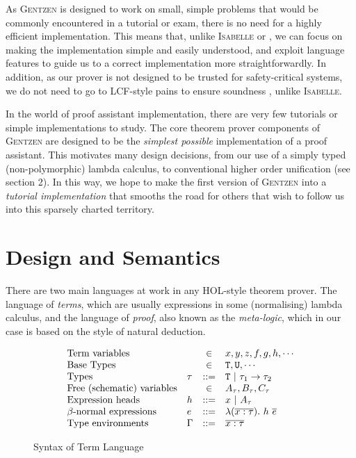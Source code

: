 \documentclass[a4paper]{jfp}
\begin{document}
As \textsc{Gentzen} is designed to work on small, simple problems that would be
commonly encountered in a tutorial or exam, there is no need for a highly
efficient implementation.  This means that, unlike \textsc{Isabelle} or
, we can focus on making the implementation simple and easily
understood, and exploit language features to guide us to a correct
implementation more straightforwardly. In addition, as our prover is not
designed to be trusted for safety-critical systems, we do not need to go to
LCF-style pains to ensure soundness \cite{Milner:1972:LCF:891954}, unlike \textsc{Isabelle}.

In the world of proof assistant implementation, there are very few tutorials or
simple implementations to study. The core theorem prover components of
\textsc{Gentzen} are designed  to be the \emph{simplest possible}
implementation of a proof assistant. This motivates many design decisions, from
our use of a simply typed (non-polymorphic) lambda calculus, to conventional
higher order unification (see section 2). In this way, we hope to make the
first version of \textsc{Gentzen} into a \emph{tutorial implementation} that
smooths the road for others that wish to follow us into this sparsely charted
territory.


\section{Design and Semantics}

There are two main languages at work in any HOL-style theorem prover. The language of \emph{terms},
which are usually expressions in some (normalising) lambda calculus, and the language of \emph{proof},
also known as the \emph{meta-logic}, which in our case is based on the style of natural deduction.

\begin{figure}
	\caption{Syntax of Term Language}
   	\begin{displaymath}
	\begin{array}{llcl}
		\text{Term variables} & & \in & x, y, z, f, g, h, \cdots \\
           \text{Base Types} & & \in & {\tt T}, {\tt U}, \cdots \\
		\text{Types} & \tau & ::= & \mathtt{T}\ |\ \tau_1 \rightarrow \tau_2\ \\
      \text{Free (schematic) variables} & & \in & A_\tau, B_\tau, C_\tau \\
      \text{Expression heads} & h & ::= & x\ |\ A_\tau \\
           \text{$\beta$-normal expressions} & e & ::= & \lambda(\overline{ x : \tau }).\ h\ \overline{e} \\
      \text{Type environments} & \Gamma & ::= & \overline{x : \tau}
	\end{array}
	\end{displaymath}
   \label{fig:terms}
\end{figure}
\end{document}
